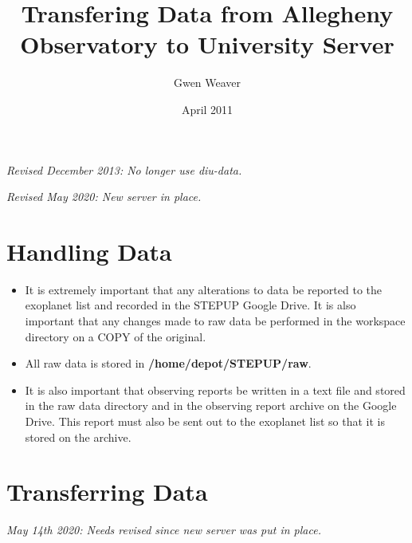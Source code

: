 \documentclass[10pt,preprint]{article}
\begin{document}
\title{Transfering Data from Allegheny Observatory to University Server}
\author{Gwen Weaver}
\date{April 2011}
\maketitle

\emph{Revised December 2013: No longer use diu-data.}

\emph{Revised May 2020: New server in place.}

\section{Handling Data}
\begin{itemize}
\item It is extremely important that any alterations to data be reported to the exoplanet list and recorded in the STEPUP Google Drive. It is also important that any changes made to raw data be performed in the workspace directory on a COPY of the original. 
\item All raw data is stored in \textbf{/home/depot/STEPUP/raw}.
\item It is also important that observing reports be written in a text file and stored in the raw data directory and in the observing report archive on the Google Drive. This report must also be sent out to the exoplanet list so that it is stored on the archive. 
\end{itemize}

\section{Transferring Data}

\emph{May 14th 2020: Needs revised since new server was put in place.}
\end{document}
